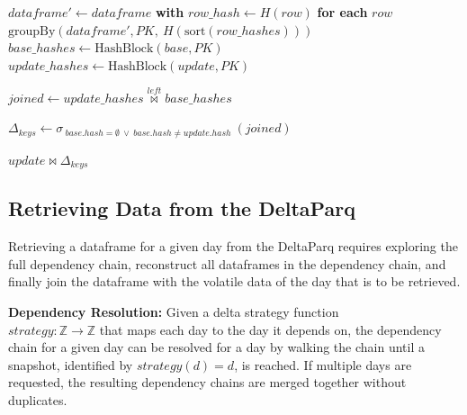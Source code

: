 \begin{algorithm}
    \caption{Hash-based Delta Generation}
    \label{alg:hash-based-delta}
    \begin{algorithmic}[1]

            \State $dataframe' \gets dataframe$ \textbf{with} $row\_hash \gets H(row)$ \textbf{for each} $row$
            \State \Return $\text{groupBy}(dataframe', PK,\ H(\text{sort}(row\_hashes)))$
        \EndFunction
        \State
            \State $base\_hashes \gets \text{HashBlock}(base, PK)$
            \State $update\_hashes \gets \text{HashBlock}(update, PK)$

            \State $joined \gets update\_hashes \overset{left}{\bowtie} base\_hashes$

            \State $\Delta_{keys} \gets \sigma_{\ base.hash = \emptyset\ \vee\ base.hash \neq update.hash}\ (joined)$

            \State \Return $update \bowtie \Delta_{keys}$
        \EndFunction

    \end{algorithmic}
\end{algorithm}

\subsection{Retrieving Data from the DeltaParq}

Retrieving a dataframe for a given day from the DeltaParq requires exploring the full 
dependency chain, reconstruct all dataframes in the dependency chain, and finally join 
the dataframe with the volatile data of the day that is to be retrieved.

\textbf{Dependency Resolution:} Given a delta strategy function\\ $strategy: \mathbb{Z} \rightarrow \mathbb{Z}$ that maps each
day to the day it depends on, the dependency chain for a given day can be resolved for a day by 
walking the chain until a snapshot, identified by $strategy(d) = d$, is reached. If multiple 
days are requested, the resulting dependency chains are merged together without duplicates.


